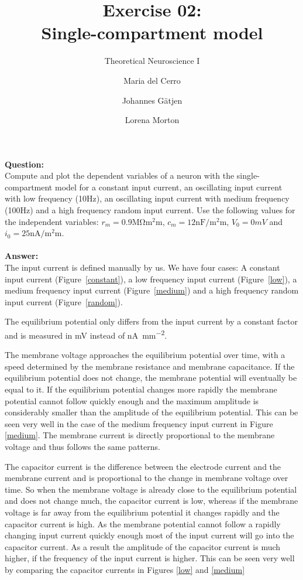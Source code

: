 \documentclass{scrartcl}
\title{Exercise 02:\\Single-compartment model}
\subtitle{Theoretical Neuroscience I}
\author{Maria del Cerro \and Johannes G\"atjen \and Lorena Morton}
\newcommand\Question{%
  \textbf{Question:}%
}
\newcommand\Answer{%
  \textbf{Answer:}%
}
\begin{document}
\maketitle
\Question\\
Compute and plot the dependent variables of a neuron with the single-compartment model for a constant input current, an oscillating input current with low frequency (10\si{Hz}), an oscillating input current with medium frequency (100\si{Hz}) and a high frequency random input current. Use the following values for the independent variables: $r_m = 0.9\si{\mega\ohm\square\milli\meter}$, $c_m = 12\si{\nano\farad\per\square\milli\meter}$, $V_0 = 0\si{mV}$ and $i_0 = 25 \si{\nano\ampere\per\square\milli\meter}$.
\\\\
\Answer\\

The input current is defined manually by us. We have four cases: A constant input current (Figure~\ref{constant}), a low frequency input current (Figure~\ref{low}), a medium frequency input current (Figure~\ref{medium}) and a high frequency random input current (Figure~\ref{random}).

The equilibrium potential only differs from the input current by a constant factor and is measured in \si{mV} instead of \si{\nano\ampere\per\square\milli\meter}.

The membrane voltage approaches the equilibrium potential over time, with a speed determined by the membrane resistance and membrane capacitance. If the equilibrium potential does not change, the membrane potential will eventually be equal to it. If the equilibrium potential changes more rapidly the membrane potential cannot follow quickly enough and the maximum amplitude is considerably smaller than the amplitude of the equilibrium potential. This can be seen very well in the case of the medium frequency input current in Figure \ref{medium}. The membrane current is directly proportional to the membrane voltage and thus follows the same patterns.

The capacitor current is the difference between the electrode current and the membrane current and is proportional to the change in membrane voltage over time. So when the membrane voltage is already close to the equilibrium potential and does not change much, the capacitor current is low, whereas if the membrane voltage is far away from the equilibrium potential it changes rapidly and the capacitor current is high. As the membrane potential cannot follow a rapidly changing input current quickly enough most of the input current will go into the capacitor current. As a result the amplitude of the capacitor current is much higher, if the frequency of the input current is higher. This can be seen very well by comparing the capacitor currents in Figures \ref{low} and \ref{medium}
\end{document}
